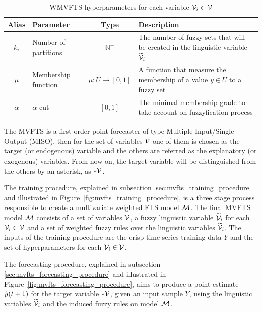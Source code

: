 \begin{table}[]
    \centering
    \begin{tabular}{|c|m{2cm}|c|m{}|} \hline
        \textbf{Alias} & \textbf{Parameter} & \textbf{Type} & \textbf{Description}  \\ \hline
         $k_i$ & Number of partitions & $\mathbb{N}^+$ & The number of fuzzy sets that will be created in the linguistic variable $\widetilde{\mathcal{V}}_i$  \\ \hline
         $\mu$ & Membership function & $\mu: U \rightarrow [0,1] $ & A function that measure the membership of a value $y \in U$ to a fuzzy set  \\\hline
         $\alpha$ & $\alpha$-cut & $[0,1]$ & The minimal membership grade to take account on fuzzyfication process \\ \hline
    \end{tabular}
    \caption{WMVFTS hyperparameters for each variable $\mathcal{V}_i \in \mathcal{V}$}
    \label{tab:mvfts_hyperparameters}
\end{table}

The MVFTS is a first order point forecaster of type Multiple Input/Single Output (MISO), then for the set of variables $\mathcal{V}$ one of them is chosen as the target (or endogenous) variable and the others are referred as the explanatory (or exogenous) variables. From now on, the target variable will be distinguished from the others by an asterisk, as $*\mathcal{V}$.

The training procedure, explained in subsection \ref{sec:mvfts_training_procedure} and illustrated in Figure~\ref{fig:mvfts_training_procedure}, is a three stage process responsible to create a multivariate weighted FTS model $\mathcal{M}$. The final MVFTS model  $\mathcal{M}$ consists of a set of variables $\mathcal{V}$, a fuzzy linguistic variable $\widetilde{\mathcal{V}}_i$ for each $\mathcal{V}_i \in \mathcal{V}$ and a set of weighted fuzzy rules over the linguistic variables $\widetilde{\mathcal{V}}_i$. The inputs of the training procedure are the crisp time series training data $Y$ and the set of hyperparameters for each $\mathcal{V}_i \in \mathcal{V}$.

The forecasting procedure, explained in subsection \ref{sec:mvfts_forecasting_procedure} and illustrated in Figure~\ref{fig:mvfts_forecasting_procedure}, aims to produce a point estimate $\hat{y}(t+1)$ for the target variable $*\mathcal{V}$, given an input sample $Y$, using the linguistic variables $\widetilde{\mathcal{V}}_i$ and the induced fuzzy rules on model $\mathcal{M}$.

